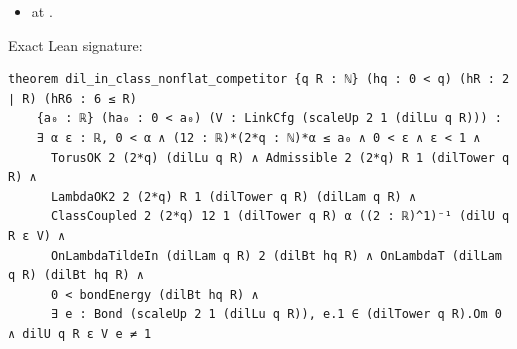 \begin{theorem}[bp-033]
\begin{itemize}
\item \texttt{} at \texttt{}.
\end{itemize}
\par Exact Lean signature:
\begin{verbatim}
theorem dil_in_class_nonflat_competitor {q R : ℕ} (hq : 0 < q) (hR : 2 ∣ R) (hR6 : 6 ≤ R)
    {a₀ : ℝ} (ha₀ : 0 < a₀) (V : LinkCfg (scaleUp 2 1 (dilLu q R))) :
    ∃ α ε : ℝ, 0 < α ∧ (12 : ℝ)*(2*q : ℕ)*α ≤ a₀ ∧ 0 < ε ∧ ε < 1 ∧
      TorusOK 2 (2*q) (dilLu q R) ∧ Admissible 2 (2*q) R 1 (dilTower q R) ∧
      LambdaOK2 2 (2*q) R 1 (dilTower q R) (dilLam q R) ∧
      ClassCoupled 2 (2*q) 12 1 (dilTower q R) α ((2 : ℝ)^1)⁻¹ (dilU q R ε V) ∧
      OnLambdaTildeIn (dilLam q R) 2 (dilBt hq R) ∧ OnLambdaT (dilLam q R) (dilBt hq R) ∧
      0 < bondEnergy (dilBt hq R) ∧
      ∃ e : Bond (scaleUp 2 1 (dilLu q R)), e.1 ∈ (dilTower q R).Om 0 ∧ dilU q R ε V e ≠ 1
\end{verbatim}
\end{theorem}

